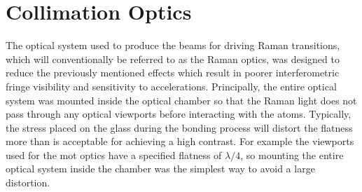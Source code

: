 \section{Collimation Optics}\label{sec:setup_ramanoptics}
The optical system used to produce the beams for driving Raman transitions,
which will conventionally be referred to as the Raman optics, was designed to
reduce the previously mentioned effects which result in poorer interferometric
fringe visibility and sensitivity to accelerations. Principally, the entire
optical system was mounted inside the optical chamber so that the Raman light
does not pass through any optical viewports before interacting with the atoms.
Typically, the stress placed on the glass during the bonding process will
distort the flatness more than is acceptable for achieving a high contrast. For
example the viewports used for the \ac{mot} optics have a specified flatness of
\(\lambda/4\), so mounting the entire optical system inside the chamber was the
simplest way to avoid a large distortion. 
